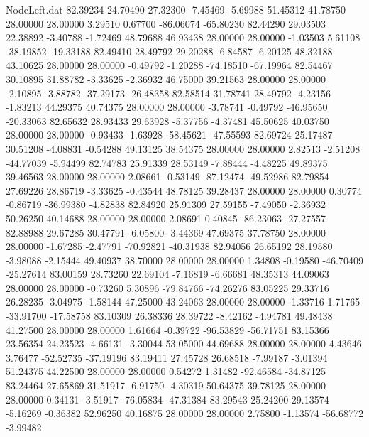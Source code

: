 \begin{filecontents}{NodeLeft.dat}
  82.39234   24.70490   27.32300    -7.45469   -5.69988   51.45312   41.78750   28.00000   28.00000    3.29510    0.67700  -86.06074  -65.80230
  82.44290   29.03503   22.38892    -3.40788   -1.72469   48.79688   46.93438   28.00000   28.00000   -1.03503    5.61108  -38.19852  -19.33188
  82.49410   28.49792   29.20288    -6.84587   -6.20125   48.32188   43.10625   28.00000   28.00000   -0.49792   -1.20288  -74.18510  -67.19964
  82.54467   30.10895   31.88782    -3.33625   -2.36932   46.75000   39.21563   28.00000   28.00000   -2.10895   -3.88782  -37.29173  -26.48358
  82.58514   31.78741   28.49792    -4.23156   -1.83213   44.29375   40.74375   28.00000   28.00000   -3.78741   -0.49792  -46.95650  -20.33063
  82.65632   28.93433   29.63928    -5.37756   -4.37481   45.50625   40.03750   28.00000   28.00000   -0.93433   -1.63928  -58.45621  -47.55593
  82.69724   25.17487   30.51208    -4.08831   -0.54288   49.13125   38.54375   28.00000   28.00000    2.82513   -2.51208  -44.77039   -5.94499
  82.74783   25.91339   28.53149    -7.88444   -4.48225   49.89375   39.46563   28.00000   28.00000    2.08661   -0.53149  -87.12474  -49.52986
  82.79854   27.69226   28.86719    -3.33625   -0.43544   48.78125   39.28437   28.00000   28.00000    0.30774   -0.86719  -36.99380   -4.82838
  82.84920   25.91309   27.59155    -7.49050   -2.36932   50.26250   40.14688   28.00000   28.00000    2.08691    0.40845  -86.23063  -27.27557
  82.88988   29.67285   30.47791    -6.05800   -3.44369   47.69375   37.78750   28.00000   28.00000   -1.67285   -2.47791  -70.92821  -40.31938
  82.94056   26.65192   28.19580    -3.98088   -2.15444   49.40937   38.70000   28.00000   28.00000    1.34808   -0.19580  -46.70409  -25.27614
  83.00159   28.73260   22.69104    -7.16819   -6.66681   48.35313   44.09063   28.00000   28.00000   -0.73260    5.30896  -79.84766  -74.26276
  83.05225   29.33716   26.28235    -3.04975   -1.58144   47.25000   43.24063   28.00000   28.00000   -1.33716    1.71765  -33.91700  -17.58758
  83.10309   26.38336   28.39722    -8.42162   -4.94781   49.48438   41.27500   28.00000   28.00000    1.61664   -0.39722  -96.53829  -56.71751
  83.15366   23.56354   24.23523    -4.66131   -3.30044   53.05000   44.69688   28.00000   28.00000    4.43646    3.76477  -52.52735  -37.19196
  83.19411   27.45728   26.68518    -7.99187   -3.01394   51.24375   44.22500   28.00000   28.00000    0.54272    1.31482  -92.46584  -34.87125
  83.24464   27.65869   31.51917    -6.91750   -4.30319   50.64375   39.78125   28.00000   28.00000    0.34131   -3.51917  -76.05834  -47.31384
  83.29543   25.24200   29.13574    -5.16269   -0.36382   52.96250   40.16875   28.00000   28.00000    2.75800   -1.13574  -56.68772   -3.99482

\end{filecontents}
